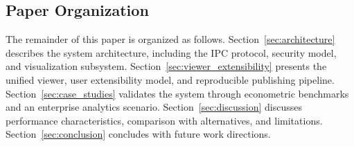 \subsection{Paper Organization}

The remainder of this paper is organized as follows. Section~\ref{sec:architecture} describes the system architecture, including the IPC protocol, security model, and visualization subsystem. Section~\ref{sec:viewer_extensibility} presents the unified viewer, user extensibility model, and reproducible publishing pipeline. Section~\ref{sec:case_studies} validates the system through econometric benchmarks and an enterprise analytics scenario. Section~\ref{sec:discussion} discusses performance characteristics, comparison with alternatives, and limitations. Section~\ref{sec:conclusion} concludes with future work directions.
